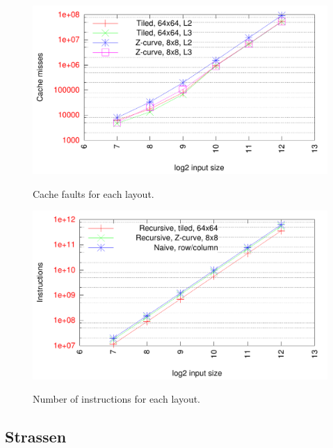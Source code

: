 \begin{figure}[h!]
  \centering
  \includegraphics[width=\textwidth]{"../project2/gnuplots/recursive_cache"}
  \label{fig:recursive_layout_cachefaults}
  \caption{Cache faults for each layout.}
\end{figure}

\begin{figure}[h!]
  \centering
  \includegraphics[width=\textwidth]{"../project2/gnuplots/recursive_instructions"}
  \label{fig:recursive_layout_instructions}
  \caption{Number of instructions for each layout.}
\end{figure}

\subsection{Strassen}


